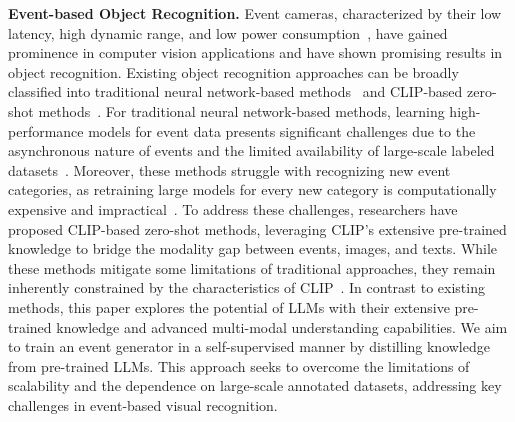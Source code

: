 \noindent \textbf{Event-based Object Recognition.} Event cameras, characterized by their low latency, high dynamic range, and low power consumption~\cite{gehrig2022high,son20174}, have gained prominence in computer vision applications and have shown promising results in object recognition. Existing object recognition approaches can be broadly classified into traditional neural network-based methods~\cite{zheng2024eventdance,su2023event} and CLIP-based zero-shot methods~\cite{ wu2023eventclip,zhou2023clip,zhou2024eventbind}. For traditional neural network-based methods, learning high-performance models for event data presents significant challenges due to the asynchronous nature of events and the limited availability of large-scale labeled datasets~\cite{wu2023eventclip}. Moreover, these methods struggle with recognizing new event categories, as retraining large models for every new category is computationally expensive and impractical~\cite{zhou2024eventbind,gehrig2024low}. To address these challenges, researchers have proposed CLIP-based zero-shot methods, leveraging CLIP’s extensive pre-trained knowledge to bridge the modality gap between events, images, and texts. While these methods mitigate some limitations of traditional approaches, they remain inherently constrained by the characteristics of CLIP~\cite{yu2024can}. In contrast to existing methods, this paper explores the potential of LLMs with their extensive pre-trained knowledge and advanced multi-modal understanding capabilities. We aim to train an event generator in a self-supervised manner by distilling knowledge from pre-trained LLMs. This approach seeks to overcome the limitations of scalability and the dependence on large-scale annotated datasets, addressing key challenges in event-based visual recognition.